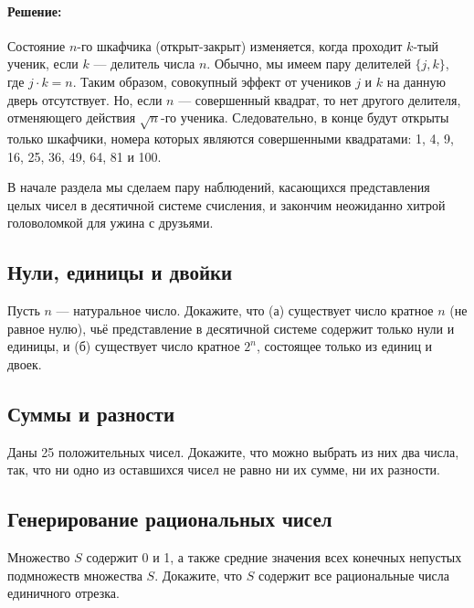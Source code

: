 \paragraph{Решение:}

Состояние $n$-го шкафчика (открыт-закрыт) изменяется, когда проходит $k$-тый ученик, если $k$ --- делитель числа $n$.
Обычно, мы имеем пару делителей $\{j,k\}$, где $j\cdot k=n$.
Таким образом, совокупный эффект от учеников $j$ и $k$ на данную дверь отсутствует. %
Но, если $n$ --- совершенный квадрат, то нет другого делителя, отменяющего действия $\sqrt{n}$-го ученика.
Следовательно, в конце будут открыты только шкафчики, номера которых являются совершенными квадратами: 1, 4, 9, 16, 25, 36, 49, 64, 81 и 100.\heart
 
В начале раздела мы сделаем пару наблюдений, касающихся представления целых чисел в десятичной системе счисления, и закончим неожиданно хитрой головоломкой для ужина с друзьями. %

\subsection*{Нули, единицы и двойки}%

Пусть $n$ --- натуральное число.
Докажите, что (а) существует число кратное $n$ (не равное нулю), чьё представление в десятичной системе содержит только нули и единицы, и
(б) существует число кратное $2^n$, состоящее только из единиц и двоек.

\subsection*{Суммы и разности} %

Даны 25 положительных чисел.
Докажите, что можно выбрать из них два числа, так, что ни одно из оставшихся чисел не равно ни их сумме, ни их разности.

\subsection*{Генерирование рациональных чисел}%

Множество $S$ содержит 0 и 1, а также средние значения всех конечных непустых подмножеств множества $S$.
Докажите, что $S$ содержит все рациональные числа единичного отрезка.

